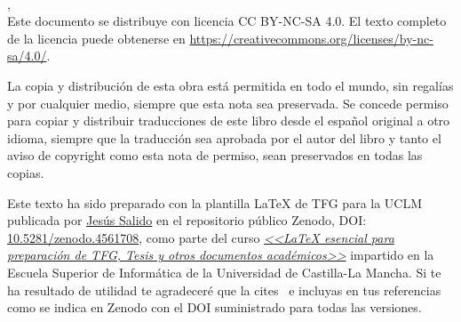 %
%


\ifspanish
\else
\fi
\null\vspace{6cm}
\makeatletter
{\small \noindent \@tituloCorto\\
\textcopyright{} \@autor, \@yearTF\\[1cm]
Este documento se distribuye con licencia CC BY-NC-SA 4.0. El texto completo de la licencia puede obtenerse en \url{https://creativecommons.org/licenses/by-nc-sa/4.0/}.
\makeatother

La copia y distribución de esta obra está permitida en todo el mundo, sin regalías y por cualquier medio, siempre que esta nota sea preservada. Se concede permiso para copiar y distribuir traducciones de este libro desde el español original a otro idioma, siempre que la traducción sea aprobada por el autor del libro y tanto el aviso de copyright como esta nota de permiso, sean preservados en todas las copias.


\vfill
Este texto ha sido preparado con la plantilla \LaTeX{} de TFG para la UCLM publicada por \href{https://www.esi.uclm.es/www/jsalido}{Jesús Salido} en el repositorio público Zenodo, DOI: \href{https://doi.org/10.5281/zenodo.4561708}{10.5281/zenodo.4561708}, como parte del curso \href{http://visilab.etsii.uclm.es/?page_id=1468}{\emph{<<\LaTeX{} esencial para preparación de TFG, Tesis y otros documentos académicos>>}} impartido en la Escuela Superior de Informática de la Universidad de Castilla-La Mancha. Si te ha resultado de utilidad te agradeceré que la cites~\cite{salido19} e incluyas en tus referencias como se indica en Zenodo con el DOI suministrado para todas las versiones.}

